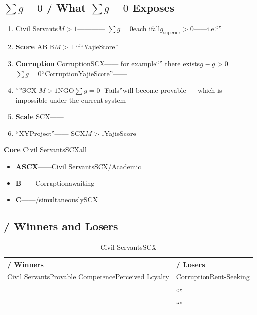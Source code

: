 \documentclass[12pt,a4paper]{article}
\theoremstyle{remark}
\newcommand{\sumgeq}{\sum g = 0}
\begin{document}
\subsection{$\sumgeq$ / What $\sumgeq$ Exposes}

\begin{enumerate}[leftmargin=*, label=\textbf{(\arabic*)}]
    \item \textbf{}
    Civil Servants$M>1$————
    $\sumgeq$each
    ifall$g_{\text{superior}} > 0$——i.e.``''

    \item \textbf{Score}
    AB
    B$M>1$
    if``YajieScore''

    \item \textbf{Corruption}
    CorruptionSCX——
    for example``''
    there exists$g_{\text{}} - g_{\text{}} > 0$
    $\sumgeq$``CorruptionYajieScore''——\textbf{}

    \item \textbf{}
    ``''SCX
    $M>1$NGO$\sumgeq$
    ``Fails''will become provable — which is impossible under the current system

    \item \textbf{Scale}
    SCX——
    

    \item \textbf{}
    ``XYProject''——
    SCX$M>1$YajieScore
\end{enumerate}

\textbf{Core}
Civil ServantsSCXall\textbf{}




\begin{itemize}[leftmargin=*]
    \item \textbf{ASCX}——Civil ServantsSCX/Academic

    \item \textbf{B}——Corruptionawaiting

    \item \textbf{C}——/simultaneouslySCX
\end{itemize}

\subsection{ / Winners and Losers}

\begin{table}[H]
\centering
\caption{Civil ServantsSCX}
\label{tab:cs_wl}
\begin{tabular}{@{}p{7cm}p{7cm}@{}}
\toprule
\textbf{ / Winners} & \textbf{ / Losers} \\
\midrule
Civil ServantsProvable CompetencePerceived Loyalty & CorruptionRent-Seeking \\
\addlinespace
 &  \\
\addlinespace
 & ``'' \\
\addlinespace
 & ``'' \\
\bottomrule
\end{tabular}
\end{table}
\end{document}
